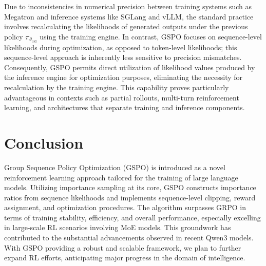 Due to inconsistencies in numerical precision between training systems such as Megatron and inference systems like SGLang and vLLM, the standard practice involves recalculating the likelihoods of generated outputs under the previous policy $\pi_{\theta_\text{old}}$ using the training engine. In contrast, GSPO focuses on sequence-level likelihoods during optimization, as opposed to token-level likelihoods; this sequence-level approach is inherently less sensitive to precision mismatches. Consequently, GSPO permits direct utilization of likelihood values produced by the inference engine for optimization purposes, eliminating the necessity for recalculation by the training engine. This capability proves particularly advantageous in contexts such as partial rollouts, multi-turn reinforcement learning, and architectures that separate training and inference components.

\section{Conclusion}

Group Sequence Policy Optimization (GSPO) is introduced as a novel reinforcement learning approach tailored for the training of large language models. Utilizing importance sampling at its core, GSPO constructs importance ratios from sequence likelihoods and implements sequence-level clipping, reward assignment, and optimization procedures. The algorithm surpasses GRPO in terms of training stability, efficiency, and overall performance, especially excelling in large-scale RL scenarios involving MoE models. This groundwork has contributed to the substantial advancements observed in recent Qwen3 models. With GSPO providing a robust and scalable framework, we plan to further expand RL efforts, anticipating major progress in the domain of intelligence.

